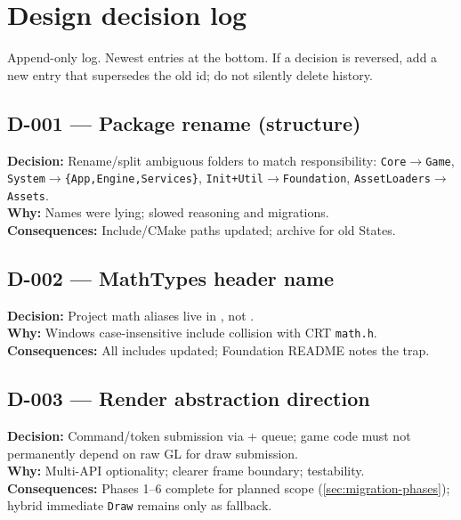 \section{Design decision log}
\label{sec:decisions}

Append-only log. Newest entries at the bottom. If a decision is reversed, add a
new entry that supersedes the old id; do not silently delete history.

\subsection*{D-001 --- Package rename (structure)}
\begin{decisionbox}[title={D-001 \quad 2026-07-28}]
\textbf{Decision:} Rename/split ambiguous folders to match responsibility:
\texttt{Core$\rightarrow$Game}, \texttt{System$\rightarrow$\{App,Engine,Services\}},
\texttt{Init+Util$\rightarrow$Foundation}, \texttt{AssetLoaders$\rightarrow$Assets}.\\
\textbf{Why:} Names were lying; slowed reasoning and migrations.\\
\textbf{Consequences:} Include/CMake paths updated; archive for old States.
\end{decisionbox}

\subsection*{D-002 --- MathTypes header name}
\begin{decisionbox}[title={D-002 \quad 2026-07-28}]
\textbf{Decision:} Project math aliases live in , not
.\\
\textbf{Why:} Windows case-insensitive include collision with CRT
\texttt{math.h}.\\
\textbf{Consequences:} All includes updated; Foundation README notes the trap.
\end{decisionbox}

\subsection*{D-003 --- Render abstraction direction}
\begin{decisionbox}[title={D-003 \quad 2026-07-28 (implemented; see D-R*) }]
\textbf{Decision:} Command/token submission via 
+  queue; game code must not permanently depend on
raw GL for draw submission.\\
\textbf{Why:} Multi-API optionality; clearer frame boundary; testability.\\
\textbf{Consequences:} Phases 1--6 complete for planned scope
(\cref{sec:migration-phases}); hybrid immediate \texttt{Draw} remains only as
fallback.
\end{decisionbox}

